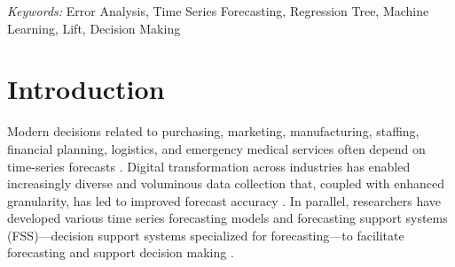 \documentclass[12pt]{article}
\begin{document}
\begin{abstract}
\end{abstract}

\noindent%
{\it Keywords:} Error Analysis, Time Series Forecasting, Regression Tree, Machine Learning, Lift, Decision Making
\vfill

\newpage
{} %

\section{Introduction}
\label{sec:Intro}
Modern decisions related to purchasing, marketing, manufacturing, staffing, financial planning, logistics, and emergency medical services often depend on time-series forecasts \citep{abreu2023}. Digital transformation across industries has enabled increasingly diverse and voluminous data collection that, coupled with enhanced granularity, has led to improved forecast accuracy \citep{chae2024}. In parallel, researchers have developed various time series forecasting models and forecasting support systems (FSS)---decision support systems specialized for forecasting---to facilitate forecasting and support decision making \citep{%
petropoulos2022}. %
\end{document}
